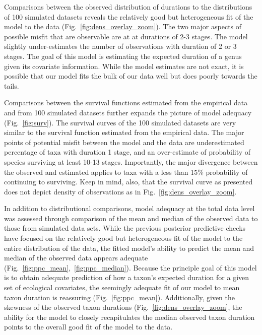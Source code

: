 \documentclass[11pt]{article}
\begin{document}

Comparisons between the observed distribution of durations to the distributions of 100 simulated datasets reveals the relatively good but heterogeneous fit of the model to the data (Fig.~\ref{fig:dens_overlay_zoom}). The two major aspects of possible misfit that are observable are at at durations of 2-3 stages. The model slightly under-estimates the number of observations with duration of 2 or 3 stages. The goal of this model is estimating the expected duration of a genus given its covariate information. While the model estimates are not exact, it is possible that our model fits the bulk of our data well but does poorly towards the tails. 

Comparisons between the survival functions estimated from the empirical data and from 100 simulated datasets further expands the picture of model adequacy (Fig.~\ref{fig:surv}). The survival curves of the 100 simulated datasets are very similar to the survival function estimated from the empirical data. The major points of potential misfit between the model and the data are underestimated percentage of taxa with duration 1 stage, and an over-estimate of probability of species surviving at least 10-13 stages. Importantly, the major divergence between the observed and estimated applies to taxa with a less than 15\% probability of continuing to surviving. Keep in mind, also, that the survival curve as presented does not depict density of observations as in Fig.~\ref{fig:dens_overlay_zoom}.

In addition to distributional comparisons, model adequacy at the total data level was assessed through comparison of the mean and median of the observed data to those from simulated data sets. While the previous posterior predictive checks have focused on the relatively good but heterogeneous fit of the model to the entire distribution of the data, the fitted model's ability to predict the mean and median of the observed data appears adequate (Fig.~\ref{fig:ppc_mean},~\ref{fig:ppc_median}). Because the principle goal of this model is to obtain adequate prediction of how a taxon's expected duration for a given set of ecological covariates, the seemingly adequate fit of our model to mean taxon duration is reassuring (Fig.~\ref{fig:ppc_mean}). Additionally, given the skewness of the observed taxon durations (Fig.~\ref{fig:dens_overlay_zoom}, the ability for the model to closely recapitulates the median observed taxon duration points to the overall good fit of the model to the data.
\end{document}
